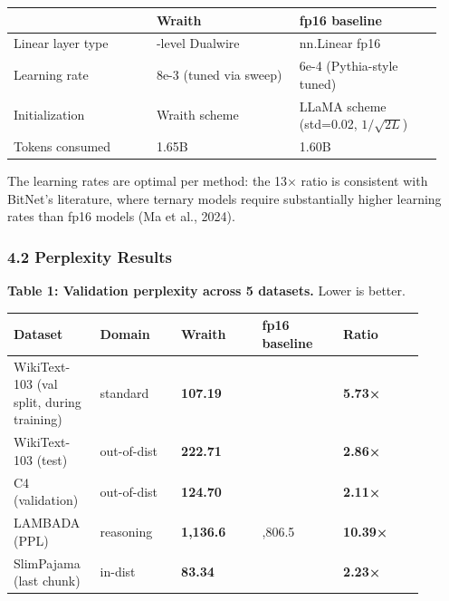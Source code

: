 {\def\LTcaptype{none} %
{\footnotesize\setlength{\tabcolsep}{3pt}
\begin{longtable}[]{@{}>{\raggedright\arraybackslash}p{0.313\linewidth}>{\raggedright\arraybackslash}p{0.313\linewidth}>{\raggedright\arraybackslash}p{0.313\linewidth}@{}}
\toprule\noalign{}
 & Wraith & fp16 baseline \\
\midrule\noalign{}
\endhead
\bottomrule\noalign{}
\endlastfoot
Linear layer type & 9-level Dualwire & nn.Linear fp16 \\
Learning rate & 8e-3 (tuned via sweep) & 6e-4 (Pythia-style tuned) \\
Initialization & Wraith scheme & LLaMA scheme (std=0.02,
\(1/\sqrt{2L}\)) \\
Tokens consumed & 1.65B & 1.60B \\
\end{longtable}
}
}

The learning rates are optimal per method: the 13× ratio is consistent
with BitNet's literature, where ternary models require substantially
higher learning rates than fp16 models (Ma et al., 2024).

\subsubsection{4.2 Perplexity Results}\label{perplexity-results}

\textbf{Table 1: Validation perplexity across 5 datasets.} Lower is
better.

{\def\LTcaptype{none} %
{\footnotesize\setlength{\tabcolsep}{3pt}
\begin{longtable}[]{@{}>{\raggedright\arraybackslash}p{0.180\linewidth}>{\raggedright\arraybackslash}p{0.180\linewidth}>{\raggedright\arraybackslash}p{0.180\linewidth}>{\raggedright\arraybackslash}p{0.180\linewidth}>{\raggedright\arraybackslash}p{0.180\linewidth}@{}}
\toprule\noalign{}
Dataset & Domain & Wraith & fp16 baseline & Ratio \\
\midrule\noalign{}
\endhead
\bottomrule\noalign{}
\endlastfoot
WikiText-103 (val split, during training) & standard & \textbf{107.19} &
613.96 & \textbf{5.73×} \\
WikiText-103 (test) & out-of-dist & \textbf{222.71} & 636.44 &
\textbf{2.86×} \\
C4 (validation) & out-of-dist & \textbf{124.70} & 263.13 &
\textbf{2.11×} \\
LAMBADA (PPL) & reasoning & \textbf{1,136.6} & 11,806.5 &
\textbf{10.39×} \\
SlimPajama (last chunk) & in-dist & \textbf{83.34} & 185.84 &
\textbf{2.23×} \\
\end{longtable}
}
}

